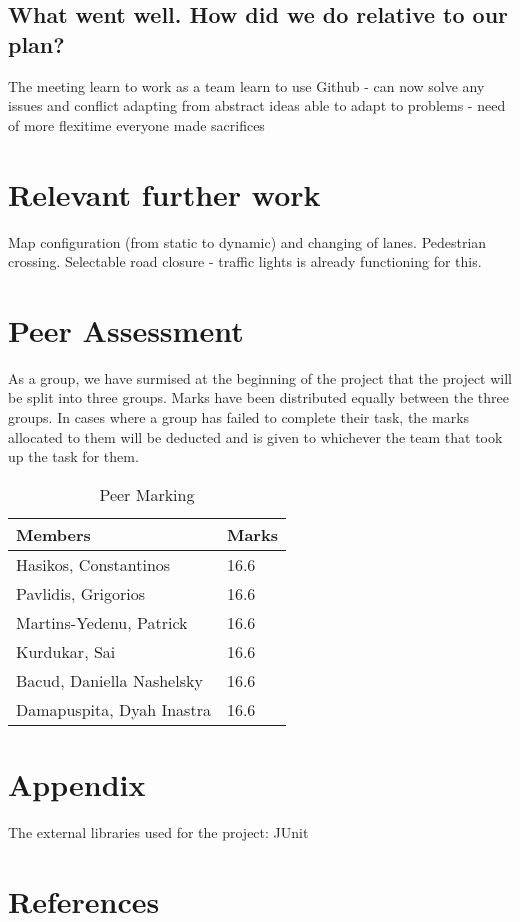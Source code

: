\documentclass{article}[11pt,Tahoma]
\begin{document}
		\subsection{What went well.  How did we do relative to our plan?}
		The meeting 	
		learn to work as a team
		learn to use Github -  can now solve any issues and conflict
		adapting from abstract ideas
		able to adapt to problems - need of more flexitime 
		everyone made sacrifices 
		
	\section{Relevant further work}  
			Map configuration (from static to dynamic) and changing of lanes. Pedestrian crossing. Selectable road closure - traffic lights is already functioning for this.
	\section{Peer Assessment}
		As a group, we have surmised at the beginning of the project that the project will be split into three groups.  Marks have been distributed equally between the three groups. In cases where a group has failed to complete their task, the marks allocated to them will be deducted and is given to whichever the team that took up the task for them.
		\begin{table}[h]
		\centering
    			\begin{tabular}{|l|l|}
    				\hline
    				\textbf{Members}                   & \textbf{Marks} \\ \hline
    				Hasikos, Constantinos     & 16.6  \\ \hline
    				Pavlidis, Grigorios       & 16.6  \\ \hline
    				Martins-Yedenu, Patrick   & 16.6  \\ \hline
    				Kurdukar, Sai             & 16.6  \\ \hline
    				Bacud, Daniella Nashelsky & 16.6  \\ \hline
    				Damapuspita, Dyah Inastra & 16.6  \\ \hline
    			\end{tabular}
    			\caption {Peer Marking}
		\end{table}
	\section{Appendix}
		The external libraries used for the project:  
		JUnit
	\section{References}	~
\end{document}
